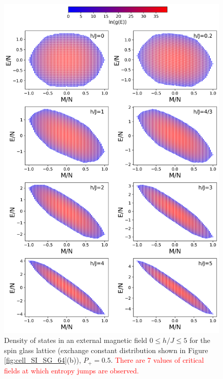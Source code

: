 \documentclass[preprint,12pt]{elsarticle}
\begin{document}
	\begin{figure}[H]
		\centering
		\includegraphics[width=1\linewidth]{pictures/HDOS_SG_64_J0.png}
		\caption{Density of states in an external magnetic field $0\leq h/J \leq 5$ for the spin glass lattice (exchange constant distribution shown in Figure \ref{fig:cell_SI_SG_64}(b)), $P_+ = 0.5$. \textcolor{red}{There are 7 values of critical fields at which entropy jumps are observed.}}
		\label{fig:HDOS_glass}
	\end{figure}
	
\end{document}
